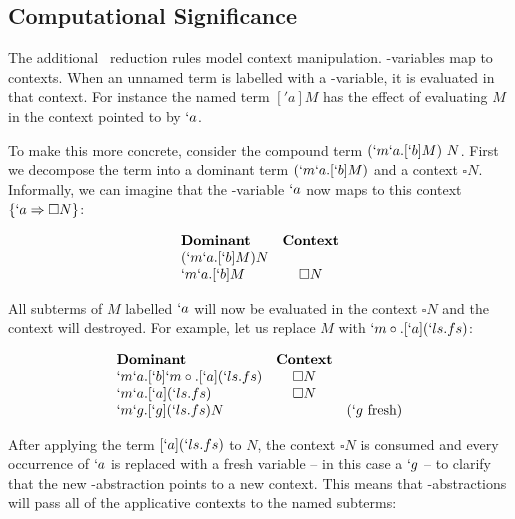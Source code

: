   \subsection{Computational Significance}

  The additional \lmu\ reduction rules model context manipulation. 
  \lmu-variables map to contexts. When an unnamed term is labelled with a 
  \lmu-variable, it is evaluated in that context. For instance the named 
  term $['a]M$ has the effect of evaluating $M$ in the context pointed to 
  by $`a$.
  
  To make this more concrete, consider the compound term $(`m`a.[`b]M)\ N$. 
  First we decompose the term into a dominant term $(`m`a.[`b]M)$ and a 
  context $\square N$. Informally, we can imagine that the \lmu-variable 
  $`a$ now maps to this context $\{`a \Rightarrow \square N\}$:
  
  \begin{example}[]
    \[
    \begin{array}{lc}
    \textbf{Dominant} & \textbf{Context} \\
    (`m`a.[`b]M) N \\
    `m`a.[`b]M & \square N \\
    \end{array}
    \]
  \end{example}

  All subterms of $M$ labelled $`a$ will now be evaluated in the context 
  $\square N$ and the context will destroyed. For example, let us replace 
  $M$ with \mbox{$`m\circ.[`a](`ls.fs)$}:
  
  \begin{example}
    \[
    \begin{array}{lcr}
    \textbf{Dominant} & \textbf{Context} \\
    `m`a.[`b]`m\circ.[`a](`ls.fs)    & \square N \\
    `m`a.[`a](`ls.fs)    & \square N \\
    `m`g.[`g](`ls.fs)N   & & (`g\ \text{fresh})  \\
    \end{array}
    \]
  \end{example}

  After applying the term $[`a](`ls.fs)$ to $N$, the context $\square N$
  is consumed and every occurrence of $`a$ is replaced with a fresh 
  variable -- in this case a $`g$ -- to clarify that the new 
  \lmu-abstraction points to a new context. This means that 
  \lmu-abstractions will pass all of the applicative contexts to the
  named subterms:
  
